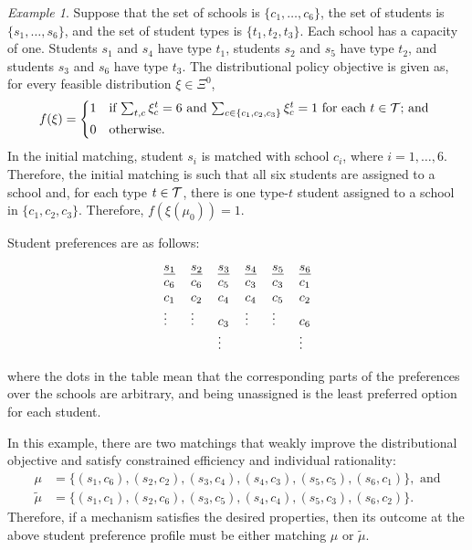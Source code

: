 \documentclass[12pt]{amsart}
\theoremstyle{remark}
\newtheorem{example}{Example}
\begin{document}
\begin{example}\label{ex:notconvex}
Suppose that the set of schools is $\{c_1, \ldots ,c_6\}$,
the set of students is $\{s_1, \ldots, s_6\}$, and the set of student
types is $\{t_1,t_2,t_3\}$. Each school has a capacity of one.
Students $s_1$ and $s_4$ have type $t_1$, students $s_2$ and $s_5$ have type $t_2$, and students $s_3$ and $s_6$ have type $t_3$.
The distributional policy objective is given as, for every feasible distribution $\xi\in \Xi^0$,
\[  f(\xi) = \begin{cases*}
                    1 & if $\sum_{t,c} \xi_c^t = 6$ and $\sum_{c \in \{c_1, c_2, c_3\}} \xi_c^t = 1$ for each $t\in \calt$; and  \\
                    0 & otherwise.
                 \end{cases*} \]
In the initial matching, student $s_i$ is matched with school $c_i$, where $i=1,\ldots,6$. Therefore, the initial matching is such that all six students are assigned to a school and, for each type $t\in \mathcal{T}$, there is one type-$t$ student assigned to a school in $\{c_1,c_2,c_3\}$. Therefore, $f(\xi(\mu_0)) = 1$.

Student preferences are as follows:
\[
\begin{tabular}
[c]{llllll}%
$\underline{s_{1}}$ & $\underline{s_{2}}$ & $\underline{s_{3}}$ &
$\underline{s_{4}}$ & $\underline{s_{5}}$ & $\underline{s_{6}}$\\
$c_6$ & $c_6$ & $c_5$ & $c_{3}$ & $c_3$ & $c_1$\\
$c_1$ & $c_2$ & $c_4$ & $c_4$ & $c_{5}$ & $c_2$\\
\vdots & \vdots & $c_3$ &  \vdots & \vdots  & $c_6$\\
          &            & \vdots &             &            & \vdots
\end{tabular}
\]
\smallskip

\noindent
where the dots in the table mean that the corresponding parts of the preferences over the schools are arbitrary, and being unassigned is the least preferred option for each student.

In this example, there are two matchings that weakly improve the distributional objective and
satisfy constrained efficiency and individual rationality:
\begin{align*}
\mu & =\{(  s_{1},c_6)  ,(s_{2},c_2)
,(s_{3},c_{4}),(s_{4},c_{3}),(s_{5}
,c_{5})  ,(s_{6},c_1)\}, \text{ and} \\
\tilde \mu  & =\{(s_{1},c_{1}),(s_{2}
,c_6),(s_{3},c_5),(s_{4},c_4)
,(s_{5},c_3),(s_{6},c_2)\}.
\end{align*}
Therefore, if a mechanism satisfies the desired properties, then its outcome at the above student preference profile must be either matching $\mu$ or $\tilde \mu$.


\end{example}
\end{document}

